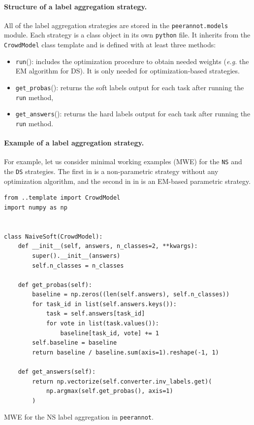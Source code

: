 \paragraph{Structure of a label aggregation strategy.}

All of the label aggregation strategies are stored in the \texttt{peerannot.models} module.
Each strategy is a class object in its own \texttt{python} file.
It inherits from the \texttt{CrowdModel} class template and is defined with at least three methods:
\begin{itemize}
    \item \texttt{run}(): includes the optimization procedure to obtain needed weights (\emph{e.g.} the EM algorithm for DS). It is only needed for optimization-based strategies.
    \item \texttt{get\_probas}(): returns the soft labels output for each task after running the \texttt{run} method,
    \item \texttt{get\_answers}(): returns the hard labels output for each task after running the \texttt{run} method.
\end{itemize}

\paragraph{Example of a label aggregation strategy.}

For example, let us consider minimal working examples (MWE) for the \texttt{NS} and the \texttt{DS} strategies.
The first in  is a non-parametric strategy without any optimization algorithm, and the second in  in  is an EM-based parametric strategy.

\begin{listing}[ht]
\begin{verbatim}
from ..template import CrowdModel
import numpy as np


class NaiveSoft(CrowdModel):
    def __init__(self, answers, n_classes=2, **kwargs):
        super().__init__(answers)
        self.n_classes = n_classes

    def get_probas(self):
        baseline = np.zeros((len(self.answers), self.n_classes))
        for task_id in list(self.answers.keys()):
            task = self.answers[task_id]
            for vote in list(task.values()):
                baseline[task_id, vote] += 1
        self.baseline = baseline
        return baseline / baseline.sum(axis=1).reshape(-1, 1)

    def get_answers(self):
        return np.vectorize(self.converter.inv_labels.get)(
            np.argmax(self.get_probas(), axis=1)
        )
\end{verbatim}
\caption{MWE for the NS label aggregation in \texttt{peerannot}.}
\label{listing:NS}
\end{listing}

